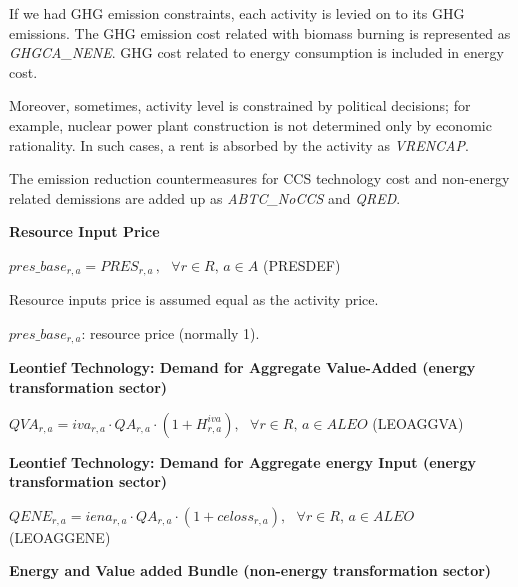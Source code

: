 \documentclass[10pt,a4paper,titlepage,dvipdfmx]{book}
\begin{document}
     If we had GHG emission constraints, each activity is levied on to its GHG emissions. The GHG emission cost related with biomass burning is represented as \textit{GHGCA\_NENE}. GHG cost related to energy consumption is included in energy cost.

Moreover, sometimes, activity level is constrained by political decisions; for example, nuclear power plant construction is not determined only by economic rationality. In such cases, a rent is absorbed by the activity as \textit{VRENCAP}.

      The emission reduction countermeasures for CCS technology cost and non-energy related demissions are added up as \textit{ABTC\_NoCCS} and \textit{QRED}. 

\begin{flushleft}\textbf{Resource Input Price}\end{flushleft}


\begin{center}$pres\_ base_{r,a}=PRES_{r,a}\,,\,\,\,\,\forall r\in R,\,a\in A$ (PRESDEF)
\end{center}

    Resource inputs price is assumed equal as the activity price.
\begin{flushleft}
$pres\_base_{r,a}$: resource price (normally 1).
\end{flushleft}

\begin{flushleft}\textbf{Leontief Technology: Demand for Aggregate Value-Added (energy transformation sector)}\end{flushleft}


\begin{center} $QVA_{r,a}=iva_{r,a}\cdot QA_{r,a}\cdot \left(1+H _{r,a}^{iva}\right),\,\,\,\,\forall r\in R,\,a\in ALEO$ (LEOAGGVA)
\end{center}

\begin{flushleft}\textbf{Leontief Technology: Demand for Aggregate energy Input (energy transformation sector)}\end{flushleft}


\begin{center}$QENE_{r,a}=iena_{r,a}\cdot QA_{r,a}\cdot \left(1+celoss_{r,a}\right),\,\,\,\,\forall r\in R,\,a\in ALEO$ (LEOAGGENE)
\end{center}

\begin{flushleft}\textbf{Energy and Value added Bundle (non-energy transformation sector)}\end{flushleft}
\end{document}
